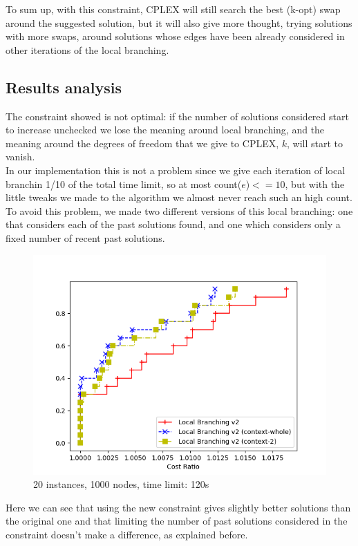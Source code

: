 To sum up, with this constraint, CPLEX will still search the best (k-opt) swap around the suggested solution, but it will also give more thought, trying solutions with more swaps, around solutions whose edges have been already considered in other iterations of the local branching.

\subsection{Results analysis}

The constraint showed is not optimal: if the number of solutions considered start to increase unchecked we lose the meaning around local branching, and the meaning around the degrees of freedom that we give to CPLEX, $k$, will start to vanish.\\
In our implementation this is not a problem since we give each iteration of local branchin 1/10 of the total time limit, so at most count($e$)$<=10$, but with the little tweaks we made to the algorithm we almost never reach such an high count.\\

To avoid this problem, we made two different versions of this local branching: one that considers each of the past solutions found, and one which considers only a fixed number of recent past solutions.

\newpage

\begin{figure}[h]
    \centering
    \includegraphics*[width=.6\textwidth]{../plots/perfprof_lbv2_costs.png}
    \caption*{20 instances, 1000 nodes, time limit: 120s}
\end{figure}

Here we can see that using the new constraint gives slightly better solutions than the original one and that limiting the number of past solutions considered in the constraint doesn't make a difference, as explained before.

